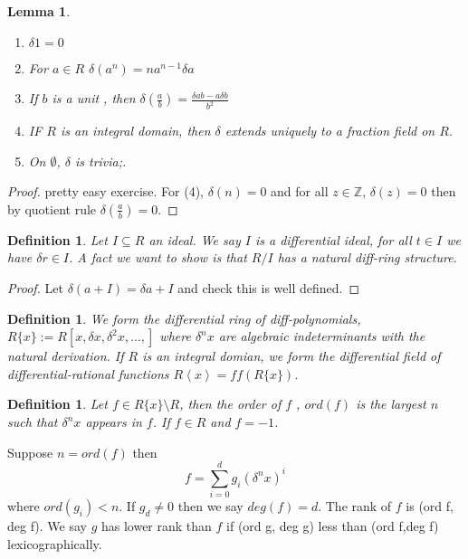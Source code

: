 \documentclass[letterpaper, 12pt]{article}
\newcommand{\bZ}{\mathbb{Z}}
\providecommand{\ip}[1]{\left\langle #1 \right\rangle}
\theoremstyle{stdthm}
\newtheorem{lem}[thm]{Lemma}
\theoremstyle{stddef}
\newtheorem{defn}[thm]{Definition}
\theoremstyle{stdnonum}
\theoremstyle{stdqands}
\theoremstyle{stdbold}
\begin{document}
\begin{lem}
\begin{enumerate}
\item $\delta 1= 0$
\item For $a \in R$ $\delta(a^n) = na^{n-1} \delta a$ 
\item If $b$ is a unit , then $\delta(\frac{a}{b}) = \frac{\delta ab - a\delta b}{b^2}$ 
\item IF $R$ is an integral domain, then $\delta$ extends uniquely to a fraction field on $R$. 
\item On $\emptyset$, $\delta$ is trivia;. 
\end{enumerate}

\end{lem}

\begin{proof}
pretty easy exercise. For (4), $\delta(n) = 0$ and for all $z \in \bZ$, $\delta(z) = 0$ then by quotient rule $\delta(\frac{a}{b}) = 0$. 
\end{proof}

\begin{defn}
Let $I\subseteq R$ an ideal. We say $I$ is a differential ideal, for all $t \in I$ we have $\delta r \in I$. A fact we want to show is that $R/I$ has a natural diff-ring structure. 
\end{defn}

\begin{proof}
Let $\delta(a+I) = \delta a + I$ and check this is well defined. 
\end{proof}

\begin{defn}
We form the differential ring of diff-polynomials, $R\{x\} := R[x,\delta x , \delta^2 x, \dots, ]$ where $\delta^n x$ are algebraic indeterminants with the natural derivation. If $R$ is an integral domian, we form the differential field of differential-rational functions $R\ip{x} = ff(R\{x\})$. 
\end{defn}

\begin{defn}
Let $f \in R\{x\} \setminus R$, then the order of $f$ , $ord(f)$ is the largest $n$ such that $\delta^n x$ appears in $f$. If $f \in  R$ and $f = -1$. 
\end{defn}

Suppose $n = ord(f)$ then 
\[ f = \sum_{i=0}^d g_i (\delta^n x)^i \] 
where $ord(g_i) < n$. If $g_d \neq 0$ then we say $deg(f) = d$. The rank of $f$ is  (ord f, deg f). We say $g$ has lower rank than $f$ if (ord g, deg g) less than (ord f,deg f) lexicographically. 
\end{document}
